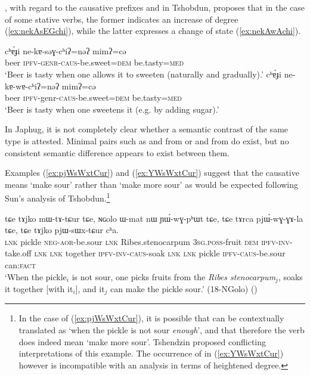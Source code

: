\citet{jackson06paisheng, jackson14morpho}, with regard to the causative prefixes  and  in Tshobdun, proposes that in the case of some stative verbs, the former indicates an increase of degree (\ref{ex:nekAsEGchi}), while the latter expresses a change of state (\ref{ex:nekAwAchi}). 

\begin{exe}
\ex 
\begin{xlist}
\ex \label{ex:nekAsEGchi}
\gll cʰɐ́ɟi ne-kɐ-səɣ-cʰiʔ=nəʔ mimʔ=cə \\
beer \textsc{ipfv}-\textsc{genr}-\textsc{caus}-be.sweet=\textsc{dem} be.tasty=\textsc{med} \\
\glt ‘Beer is tasty when one allows it to sweeten (naturally and gradually).’
\ex \label{ex:nekAwAchi}
\gll cʰɐ́ɟi ne-kɐ-wɐ-cʰiʔ=nəʔ mimʔ=cə \\
beer \textsc{ipfv}-genr-\textsc{caus}-be.sweet=\textsc{dem} be.tasty=\textsc{med} \\
\glt ‘Beer is tasty when one sweetens it (e.g. by adding sugar).’
\end{xlist}
\end{exe}

In Japhug, it is not completely clear whether a semantic contrast of the same type is attested. Minimal pairs such as  and  from  or  and  from  do exist, but no consistent semantic difference appears to exist between them.

Examples (\ref{ex:pjWsWxtCur}) and (\ref{ex:YWsWxtCur}) suggest that the causative   means `make sour' rather than `make more sour' as would be expected following Sun's analysis of Tshobdun.\footnote{In the case of (\ref{ex:pjWsWxtCur}), it is possible that  can be contextually translated as `when the pickle is not sour \textit{enough}', and that therefore the verb  does indeed mean `make more sour'. Tshendzin proposed conflicting interpretations of this example. The occurrence of  in (\ref{ex:YWsWxtCur}) however is incompatible with an analysis in terms of heightened degree. } 

 \begin{exe}
\ex \label{ex:pjWsWxtCur}
\gll tɕe tɤjko mɯ-tɤ-tɕur tɕe, ɴɢolo ɯ-mat nɯ ɲɯ́-wɣ-pʰɯt tɕe, tɕe tɤrca pjɯ́-wɣ-ɣɤ-la tɕe, tɕe tɤjko pjɯ-sɯx-tɕur cʰa. \\
\textsc{lnk} pickle \textsc{neg}-\textsc{aor}-be.sour \textsc{lnk}  Ribes.stenocarpum \textsc{3sg}.\textsc{poss}-fruit \textsc{dem} \textsc{ipfv}-\textsc{inv}-take.off \textsc{lnk} \textsc{lnk}  together \textsc{ipfv}-\textsc{inv}-\textsc{caus}-soak \textsc{lnk} \textsc{lnk} pickle \textsc{ipfv}-\textsc{caus}-be.sour can:\textsc{fact} \\
\glt `When the pickle$_i$ is not sour, one picks fruits from the \textit{Ribes stenocarpum}$_j$, soaks it together [with it$_i$], and it$_j$ can make the pickle sour.' (18-NGolo)
()
\end{exe}

